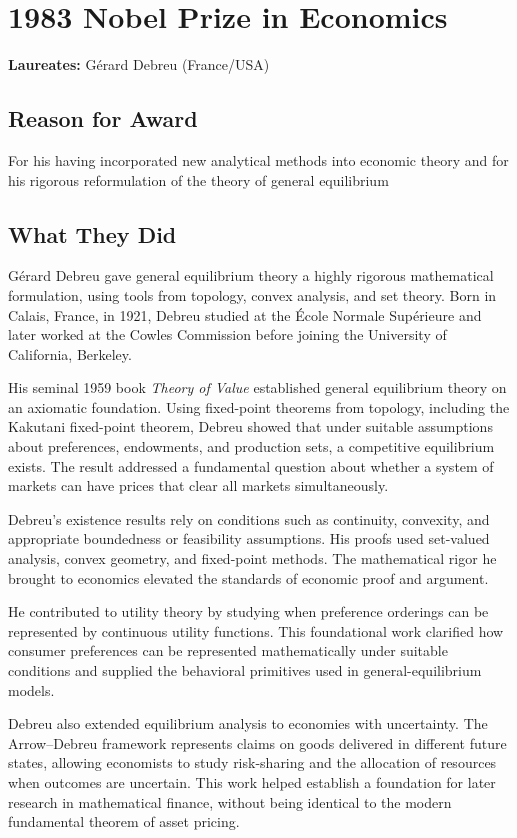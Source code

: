 \chapter{1983 Nobel Prize in Economics}
\textbf{Laureates: }Gérard Debreu (France/USA)

\section*{Reason for Award}
For his having incorporated new analytical methods into economic theory and for his rigorous
reformulation of the theory of general equilibrium

\section{What They Did}
Gérard Debreu gave general equilibrium theory a highly rigorous mathematical
formulation, using tools from topology, convex analysis, and set theory. Born
in Calais, France, in 1921, Debreu studied at the École Normale Supérieure and
later worked at the Cowles Commission before joining the University of
California, Berkeley.

His seminal 1959 book \textit{Theory of Value} established general equilibrium
theory on an axiomatic foundation. Using fixed-point theorems from topology,
including the Kakutani fixed-point theorem, Debreu showed that under suitable
assumptions about preferences, endowments, and production sets, a competitive
equilibrium exists. The result addressed a fundamental question about whether
a system of markets can have prices that clear all markets simultaneously.

Debreu's existence results rely on conditions such as continuity, convexity,
and appropriate boundedness or feasibility assumptions. His proofs used
set-valued analysis, convex geometry, and fixed-point methods. The mathematical
rigor he brought to economics elevated the standards of economic proof and
argument.

He contributed to utility theory by studying when preference orderings can be
represented by continuous utility functions. This foundational work clarified
how consumer preferences can be represented mathematically under suitable
conditions and supplied the behavioral primitives used in general-equilibrium
models.

Debreu also extended equilibrium analysis to economies with uncertainty. The
Arrow--Debreu framework represents claims on goods delivered in different
future states, allowing economists to study risk-sharing and the allocation of
resources when outcomes are uncertain. This work helped establish a foundation
for later research in mathematical finance, without being identical to the
modern fundamental theorem of asset pricing.

